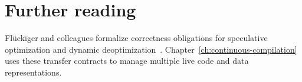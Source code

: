 \section{Further reading}
\label{sec:ch66-reading}

Flückiger and colleagues formalize correctness obligations for speculative optimization and dynamic deoptimization~\cite{fluckiger-2018-deoptimization}.
Chapter~\ref{ch:continuous-compilation} uses these transfer contracts to manage multiple live code and data representations.
